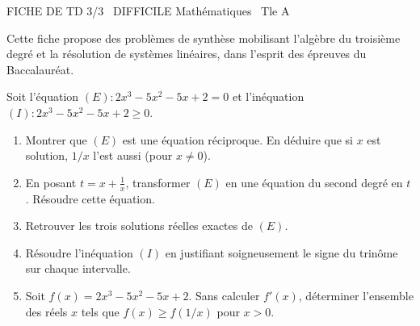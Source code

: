 \documentclass[11pt]{article}
\begin{document}
\begin{tcolorbox}[enhanced,colback=popink,colframe=popink,arc=10pt,boxrule=0pt,left=12pt,right=12pt,top=9pt,bottom=9pt]
{\color{white}\popxbold\small FICHE DE TD 3/3 \textbullet\ DIFFICILE \hfill Mathématiques \textbullet\ Tle A\par}
\end{tcolorbox}
\vspace{4pt}
Cette fiche propose des problèmes de synthèse mobilisant l'algèbre du troisième degré et la résolution de systèmes linéaires, dans l'esprit des épreuves du Baccalauréat.

\begin{exercice}
Soit l'équation $(E) : 2x^3 - 5x^2 - 5x + 2 = 0$ et l'inéquation $(I) : 2x^3 - 5x^2 - 5x + 2 \geq 0$.
\begin{enumerate}
    \item Montrer que $(E)$ est une équation réciproque. En déduire que si $x$ est solution, $1/x$ l'est aussi (pour $x \neq 0$).
    \item En posant $t = x + \frac{1}{x}$, transformer $(E)$ en une équation du second degré en $t$. Résoudre cette équation.
    \item Retrouver les trois solutions réelles exactes de $(E)$.
    \item Résoudre l'inéquation $(I)$ en justifiant soigneusement le signe du trinôme sur chaque intervalle.
    \item Soit $f(x) = 2x^3 - 5x^2 - 5x + 2$. Sans calculer $f'(x)$, déterminer l'ensemble des réels $x$ tels que $f(x) \geq f(1/x)$ pour $x > 0$.
\end{enumerate}
\end{exercice}
\end{document}
